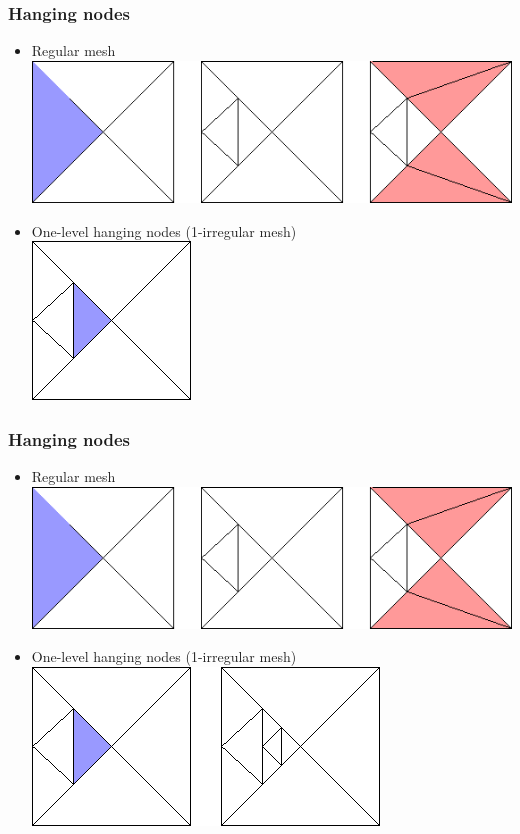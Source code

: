 \begin{frame}
  \frametitle{Hanging nodes}
  \begin{itemize}
    \item Regular mesh\\[2mm]    
    \includegraphics[height=0.3\textheight]{regular_c}
    \item One-level hanging nodes (1-irregular mesh)\\[2mm]   
    \includegraphics[height=0.3\textheight]{one_irr_a}
  \end{itemize}
\end{frame}

\begin{frame}
  \frametitle{Hanging nodes}
  \begin{itemize}
    \item Regular mesh\\[2mm]    
    \includegraphics[height=0.3\textheight]{regular_c}
    \item One-level hanging nodes (1-irregular mesh)\\[2mm]   
    \includegraphics[height=0.3\textheight]{one_irr_b}
  \end{itemize}
\end{frame}

